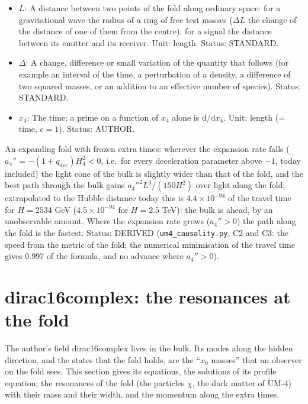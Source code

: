 \documentclass[
  10pt,
]{article}
\begin{document}
\begin{itemize}
  Status: AUTHOR.
\item
  \(L\): A distance between two points of the fold along ordinary space:
  for a gravitational wave the radius of a ring of free test masses
  (\(\Delta L\) the change of the distance of one of them from the
  centre), for a signal the distance between its emitter and its
  receiver. Unit: length. Status: STANDARD.
\item
  \(\Delta\): A change, difference or small variation of the quantity
  that follows (for example an interval of the time, a perturbation of a
  density, a difference of two squared masses, or an addition to an
  effective number of species). Status: STANDARD.
\item
  \(x_4\): The time; a prime on a function of \(x_4\) alone is
  \(\mathrm{d}/\mathrm{d}x_4\). Unit: length (= time, \(c = 1\)).
  Status: AUTHOR.
\end{itemize}

An expanding fold with frozen extra times: wherever the expansion rate
falls (\(a_4'' = -(1 + q_{\mathrm{dec}})H_4^2 < 0\), i.e.~for every
deceleration parameter above \(-1\), today included) the light cone of
the bulk is slightly wider than that of the fold, and the best path
through the bulk gains \(a_4''^2L^3/(150H^2)\) over light along the
fold; extrapolated to the Hubble distance today this is
\(4.4\times10^{-94}\) of the travel time for \(H = 2534\) GeV
(\(4.5\times10^{-94}\) for \(H = 2.5\) TeV): the bulk is ahead, by an
unobservable amount. Where the expansion rate grows (\(a_4'' > 0\)) the
path along the fold is the fastest. Status: DERIVED
(\texttt{um4\_causality.py}, C2 and C3: the speed from the metric of the
fold; the numerical minimisation of the travel time gives 0.997 of the
formula, and no advance where \(a_4'' > 0\)).

\hypertarget{dirac16complex-the-resonances-at-the-fold}{%
\section{dirac16complex: the resonances at the
fold}\label{dirac16complex-the-resonances-at-the-fold}}

The author's field dirac16complex lives in the bulk. Its modes along the
hidden direction, and the states that the fold holds, are the ``\(x_0\)
masses'' that an observer on the fold sees. This section gives its
equations, the solutions of its profile equation, the resonances of the
fold (the particles \(\chi\), the dark matter of UM-4) with their mass
and their width, and the momentum along the extra times.
\end{document}
